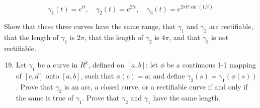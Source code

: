 \documentclass[10pt]{article}
\begin{document}
$$
\gamma_{1}(t)=e^{i t}, \quad \gamma_{2}(t)=e^{2 t t}, \quad \gamma_{3}(t)=e^{2 \pi l t \sin (1 / t)}
$$

Show that these three curves have the same range, that $\gamma_{1}$ and $\gamma_{2}$ are rectifiable, that the length of $\gamma_{1}$ is $2 \pi$, that the length of $\gamma_{2}$ is $4 \pi$, and that $\gamma_{3}$ is not rectifiable.

\begin{enumerate}
  \setcounter{enumi}{18}
  \item Let $\gamma_{1}$ be a curve in $R^{k}$, defined on $[a, b]$; let $\phi$ be a continuous 1-1 mapping of $[c, d]$ onto $[a, b]$, such that $\phi(c)=a$; and define $\gamma_{2}(s)=\gamma_{1}(\phi(s))$. Prove that $\gamma_{2}$ is an arc, a closed curve, or a rectifiable curve if and only if the same is true of $\gamma_{1}$. Prove that $\gamma_{2}$ and $\gamma_{1}$ have the same length.
\end{enumerate}
\end{document}
